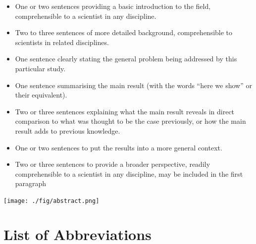 \documentclass[a4paper, 12pt]{article}
\begin{document}
\begin{itemize}
\item One or two sentences providing a basic introduction to the field, comprehensible to a scientist in any discipline.
\item Two to three sentences of more detailed background, comprehensible to
scientists in related disciplines.
\item One sentence clearly stating the general problem being addressed by this particular study.
\item One sentence summarising the main result (with the words “here we show” or their equivalent).
\item Two or three sentences explaining what the main result reveals in direct comparison to what was thought to be the case previously, or how the main result adds to previous knowledge.
\item One or two sentences to put the results into a more general context.
\item Two or three sentences to provide a broader perspective, readily comprehensible to a scientist in any discipline, may be included in the first paragraph
\end{itemize}

\begin{center}
\texttt{[image: ./fig/abstract.png]}
\end{center}
\clearpage

\setcounter{page}{1}
\tableofcontents
\clearpage
\listoffigures
\clearpage
\listoftables
\clearpage

\section*{List of Abbreviations} 
\begin{acronym}[GCRM]
\end{acronym}
\clearpage
\end{document}
